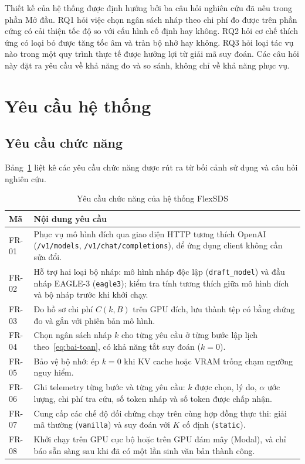 Thiết kế của hệ thống được định hướng bởi ba câu hỏi nghiên cứu đã nêu trong phần Mở đầu. RQ1 hỏi việc chọn ngân sách nháp theo chi phí đo được trên phần cứng có cải thiện tốc độ so với cấu hình cố định hay không. RQ2 hỏi cơ chế thích ứng có loại bỏ được tăng tốc âm và tràn bộ nhớ hay không. RQ3 hỏi loại tác vụ nào trong một quy trình thực tế được hưởng lợi từ giải mã suy đoán. Các câu hỏi này đặt ra yêu cầu về khả năng đo và so sánh, không chỉ về khả năng phục vụ.

\section{Yêu cầu hệ thống}
\label{sec:yeu-cau}

\subsection{Yêu cầu chức năng}

Bảng~\ref{tab:yeu-cau-chuc-nang} liệt kê các yêu cầu chức năng được rút ra từ bối cảnh sử dụng và câu hỏi nghiên cứu.

\begin{table}[htbp]
\centering
\caption{Yêu cầu chức năng của hệ thống FlexSDS}
\label{tab:yeu-cau-chuc-nang}
\small
\begin{tabularx}{\linewidth}{@{}l>{\raggedright\arraybackslash}X@{}}
\toprule
\textbf{Mã} & \textbf{Nội dung yêu cầu} \\
\midrule
FR-01 & Phục vụ mô hình đích qua giao diện HTTP tương thích OpenAI (\texttt{/v1/models}, \texttt{/v1/chat/completions}), để ứng dụng client không cần sửa đổi. \\
FR-02 & Hỗ trợ hai loại bộ nháp: mô hình nháp độc lập (\texttt{draft\_model}) và đầu nháp EAGLE-3 (\texttt{eagle3}); kiểm tra tính tương thích giữa mô hình đích và bộ nháp trước khi khởi chạy. \\
FR-03 & Đo hồ sơ chi phí $C(k, B)$ trên GPU đích, lưu thành tệp có bằng chứng đo và gắn với phiên bản mô hình. \\
FR-04 & Chọn ngân sách nháp $k$ cho từng yêu cầu ở từng bước lập lịch theo~\eqref{eq:bai-toan}, có khả năng tắt suy đoán ($k=0$). \\
FR-05 & Bảo vệ bộ nhớ: ép $k=0$ khi KV cache hoặc VRAM trống chạm ngưỡng nguy hiểm. \\
FR-06 & Ghi telemetry từng bước và từng yêu cầu: $k$ được chọn, lý do, $\alpha$ ước lượng, chi phí tra cứu, số token nháp và số token được chấp nhận. \\
FR-07 & Cung cấp các chế độ đối chứng chạy trên cùng hợp đồng thực thi: giải mã thường (\texttt{vanilla}) và suy đoán với $K$ cố định (\texttt{static}). \\
FR-08 & Khởi chạy trên GPU cục bộ hoặc trên GPU đám mây (Modal), và chỉ báo sẵn sàng sau khi đã có một lần sinh văn bản thành công. \\
\bottomrule
\end{tabularx}
\end{table}

